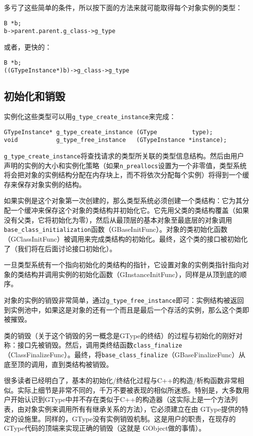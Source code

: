 多亏了这些简单的条件，所以按下面的方法来就可能取得每个对象实例的类型：
\begin{verbatim}
B *b;
b->parent.parent.g_class->g_type
\end{verbatim}
或者，更快的：
\begin{verbatim}
B *b;
((GTypeInstance*)b)->g_class->g_type
\end{verbatim}
\subsection{初始化和销毁}
实例化这些类型可以用\verb|g_type_create_instance|来完成：
\begin{verbatim}
GTypeInstance* g_type_create_instance (GType          type);
void           g_type_free_instance   (GTypeInstance *instance);
\end{verbatim}

\verb|g_type_create_instance|将查找请求的类型所关联的类型信息结构。然后由用户声明的实例的大小和实例化策略（如果\verb|n_preallocs|设置为一个非零值，类型系统将会把对象的实例结构分配在内存块上，而不将依次分配每个实例）将得到一个缓存来保存对象实例的结构。

如果实例是这个对象第一次创建的，那么类型系统必须创建一个类结构：它为其分配一个缓冲来保存这个对象的类结构并初始化它。它先用父类的类结构覆盖（如果没有父类，它将初始化为零），然后从最顶层的基本对象至最底层的对象调用\verb|base_class_initialization|函数（GBaseInitFunc）。对象的类初始化函数（GClassInitFunc）被调用来完成类结构的初始化。最终，这个类的接口被初始化了（我们将在后面讨论接口初始化）。

一旦类型系统有一个指向初始化的类结构的指针，它设置对象的实例类指针指向对象的类结构并调用实例的初始化函数（GInstanceInitFunc），同样是从顶到底的顺序。

对象的实例的销毁非常简单，通过\verb|g_type_free_instance|即可：实例结构被返回到实例池中，如果这是对象的还有一个而且是最后一个存活的实例，那么这个类即被摧毁。

类的销毁（关于这个销毁的另一概念是GType的终结）的过程与初始化的刚好对称：接口先被销毁。然后，调用类终结函数\verb|class_finalize|（ClassFinalizeFunc）。最终，将\verb|base_class_finalize|（GBaseFinalizeFunc）从底至顶的调用，直到类结构被销毁。

很多读者已经明白了，基本的初始化/终结化过程与C++的构造/析构函数非常相似。实际上细节是非常不同的，千万不要被表现的相似所迷惑。特别是，大多数用户开始认识到GType中并不存在类似于C++的构造器（这实际上是一个方法列表，由对象实例来调用所有有继承关系的方法），它必须建立在由 GType提供的特定的设施里。同样的，GType没有实例销毁机制。这是用户的职责，在现存的GType代码的顶端来实现正确的销毁（这就是 GObject做的事情）。

